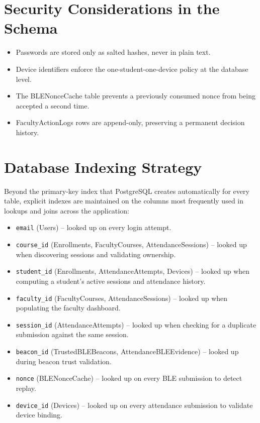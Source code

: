 \documentclass[12pt, a4paper, oneside]{report}
\begin{document}
\section{Security Considerations in the Schema}
\begin{itemize}
    \item Passwords are stored only as salted hashes, never in plain text.
    \item Device identifiers enforce the one-student-one-device policy at the database level.
    \item The BLENonceCache table prevents a previously consumed nonce from being accepted a second time.
    \item FacultyActionLogs rows are append-only, preserving a permanent decision history.
\end{itemize}

\section{Database Indexing Strategy}

Beyond the primary-key index that PostgreSQL creates automatically for every table, explicit indexes are maintained on the columns most frequently used in lookups and joins across the application:

\begin{itemize}
    \item \texttt{email} (Users) -- looked up on every login attempt.
    \item \texttt{course\_id} (Enrollments, FacultyCourses, AttendanceSessions) -- looked up when discovering sessions and validating ownership.
    \item \texttt{student\_id} (Enrollments, AttendanceAttempts, Devices) -- looked up when computing a student's active sessions and attendance history.
    \item \texttt{faculty\_id} (FacultyCourses, AttendanceSessions) -- looked up when populating the faculty dashboard.
    \item \texttt{session\_id} (AttendanceAttempts) -- looked up when checking for a duplicate submission against the same session.
    \item \texttt{beacon\_id} (TrustedBLEBeacons, AttendanceBLEEvidence) -- looked up during beacon trust validation.
    \item \texttt{nonce} (BLENonceCache) -- looked up on every BLE submission to detect replay.
    \item \texttt{device\_id} (Devices) -- looked up on every attendance submission to validate device binding.
\end{itemize}
\end{document}
